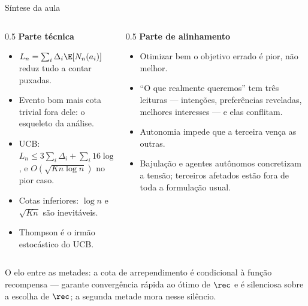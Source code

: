 \documentclass[aspectratio=169, 11pt]{beamer}
\begin{document}
\begin{frame}{Síntese da aula}
  \begin{columns}[T]
    \begin{column}{0.5\textwidth}
      \textbf{Parte técnica}
      {\footnotesize
      \begin{itemize}\setlength{\itemsep}{0.15ex}
        \item $L_n=\sum_i\Delta_i\E[N_n(a_i)]$ reduz tudo a contar puxadas.
        \item Evento bom mais cota trivial fora dele: o esqueleto da análise.
        \item UCB: $L_n \le 3\sum_i\Delta_i + \sum_i 16\log n/\Delta_i$, e
              $O(\sqrt{Kn\log n})$ no pior caso.
        \item Cotas inferiores: $\log n$ e $\sqrt{Kn}$ são inevitáveis.
        \item Thompson é o irmão estocástico do UCB.
      \end{itemize}}
    \end{column}
    \begin{column}{0.5\textwidth}
      \textbf{Parte de alinhamento}
      {\footnotesize
      \begin{itemize}\setlength{\itemsep}{0.15ex}
        \item Otimizar bem o objetivo errado é pior, não melhor.
        \item ``O que realmente queremos'' tem três leituras --- intenções,
              preferências reveladas, melhores interesses --- e elas
              conflitam.
        \item Autonomia impede que a terceira vença as outras.
        \item Bajulação e agentes autônomos concretizam a tensão; terceiros
              afetados estão fora de toda a formulação usual.
      \end{itemize}}
    \end{column}
  \end{columns}

  \begin{ideiabox}
    O elo entre as metades: \alert{a cota de arrependimento é condicional à
    função recompensa} --- garante convergência rápida ao ótimo de $\rec$ e é
    silenciosa sobre a escolha de $\rec$; a segunda metade mora nesse
    silêncio.
  \end{ideiabox}
\end{frame}
\end{document}
